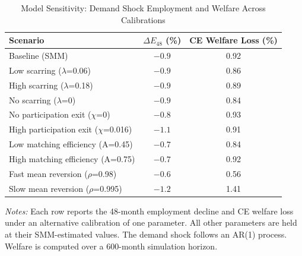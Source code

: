\begin{table}[H]
\centering
\caption{Model Sensitivity: Demand Shock Employment and Welfare Across Calibrations}
\begin{threeparttable}
\small
\begin{tabular}{lcc}
\toprule
Scenario & $\Delta E_{48}$ (\%) & CE Welfare Loss (\%) \\
\midrule
Baseline (SMM) & $-0.9$ & 0.92 \\
Low scarring ($\lambda$=0.06) & $-0.9$ & 0.86 \\
High scarring ($\lambda$=0.18) & $-0.9$ & 0.89 \\
No scarring ($\lambda$=0) & $-0.9$ & 0.84 \\
No participation exit ($\chi$=0) & $-0.8$ & 0.93 \\
High participation exit ($\chi$=0.016) & $-1.1$ & 0.91 \\
Low matching efficiency (A=0.45) & $-0.7$ & 0.84 \\
High matching efficiency (A=0.75) & $-0.7$ & 0.92 \\
Fast mean reversion ($\rho$=0.98) & $-0.6$ & 0.56 \\
Slow mean reversion ($\rho$=0.995) & $-1.2$ & 1.41 \\
\bottomrule
\end{tabular}
\begin{tablenotes}[flushleft]
\small
\item \textit{Notes:} Each row reports the 48-month employment decline and CE welfare loss under an alternative calibration of one parameter. All other parameters are held at their SMM-estimated values. The demand shock follows an AR(1) process. Welfare is computed over a 600-month simulation horizon.
\end{tablenotes}
\end{threeparttable}
\label{tab:app_model_sensitivity}
\end{table}
